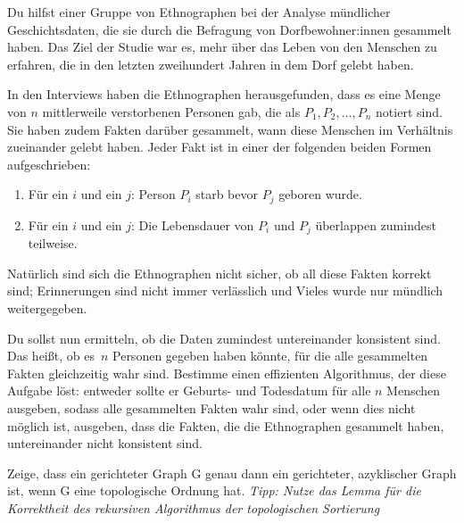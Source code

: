 \documentclass{uebung_cs}
\begin{document}
\begin{aufgabe}%
Du hilfst einer Gruppe von Ethnographen bei der Analyse mündlicher Geschichtsdaten, die sie durch die Befragung von Dorfbewohner:innen gesammelt haben. Das Ziel der Studie war es, mehr über das Leben von den Menschen zu erfahren, die in den letzten zweihundert Jahren in dem Dorf gelebt haben.

In den Interviews haben die Ethnographen herausgefunden, dass es eine Menge von $n$ mittlerweile verstorbenen Personen gab, die als $P_1, P_2, \ldots, P_n$ notiert sind.
Sie haben zudem Fakten darüber gesammelt, wann diese Menschen im Verhältnis zueinander gelebt haben. Jeder Fakt ist in einer der folgenden beiden Formen aufgeschrieben:
\begin{enumerate}
	\item Für ein $i$ und ein $j$: Person $P_i$ starb bevor $P_j$ geboren wurde.
	\item Für ein $i$ und ein $j$: Die Lebensdauer von $P_i$ und $P_j$ überlappen zumindest teilweise.
\end{enumerate}
Natürlich sind sich die Ethnographen nicht sicher, ob all diese Fakten korrekt sind; Erinnerungen sind nicht immer verlässlich und Vieles wurde nur mündlich weitergegeben.

Du sollst nun ermitteln, ob die Daten zumindest untereinander konsistent sind.
Das heißt, ob es~$n$ Personen gegeben haben könnte, für die alle gesammelten Fakten gleichzeitig wahr sind.
Bestimme einen effizienten Algorithmus, der diese Aufgabe löst: entweder sollte er Geburts- und Todesdatum für alle $n$ Menschen ausgeben, sodass alle gesammelten Fakten wahr sind, oder wenn dies nicht möglich ist, ausgeben, dass die Fakten, die die Ethnographen gesammelt haben, untereinander nicht konsistent sind. 
\end{aufgabe}


\begin{aufgabe}
Zeige, dass ein gerichteter Graph G genau dann ein gerichteter, azyklischer Graph ist, wenn G eine topologische Ordnung hat.
\textit{Tipp: Nutze das Lemma für die Korrektheit des rekursiven Algorithmus der topologischen Sortierung}
\end{aufgabe}
\end{document}
